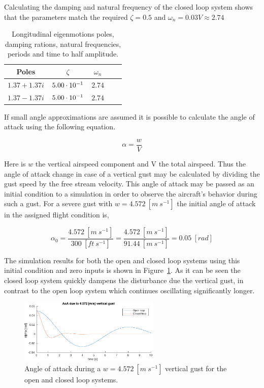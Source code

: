                                                                        
                                                                 

Calculating the damping and natural frequency of the closed loop system shows that the parameters match the required $\zeta=0.5$ and $\omega_n=0.03V\approx 2.74$
\begin{table}[h!]
    \centering
    \begin{tabular}{ c c c c c }
         Poles         & $\zeta$        & $\omega_n$ \\ \hline \hline
         $1.37 + 1.37i$ & $5.00\cdot 10^{-1}$ & $2.74$     \\  
         $1.37 - 1.37i$ & $5.00\cdot 10^{-1}$ & $2.74$     \\ \hline
    \end{tabular}
    \caption{Longitudinal eigenmotions poles, damping rations, natural frequencies, periods and time to half amplitude.}
\end{table}

If small angle approximations are assumed it is possible to calculate the angle of attack using the following equation.

\begin{equation}
    \alpha = \frac{w}{V}
\end{equation}

Here is $w$ the vertical airspeed component and V the total airspeed. Thus the angle of attack change in case of a vertical gust may be calculated by dividing the gust speed by the free stream velocity. This angle of attack may be passed as an initial condition to a simulation in order to observe the aircraft's behavior during such a gust. For a severe gust with $w=4.572\ [m\ s^{-1}]$ the initial angle of attack in the assigned flight condition is,

\begin{equation}
    \alpha_0=\frac{4.572\ [m\ s^{-1}]}{300\ [ft\ s^{-1}]}=\frac{4.572\ [m\ s^{-1}]}{91.44\ [m\ s^{-1}]} = 0.05\ [rad]
\end{equation}

The simulation results for both the open and closed loop systems using this initial condition and zero inputs is shown in Figure~\ref{fig:pc_vertgust}. As it can be seen the closed loop system quickly dampens the disturbance due the vertical gust, in contrast to the open loop system which continues oscillating significantly longer.

\begin{figure}[ht]
    \centering
    \includegraphics[width=0.6\textwidth]{figures/pc_vertgust.pdf}    
    \caption{Angle of attack during a $w=4.572\ [m\ s^{-1}]$ vertical gust for the open and closed loop systems.}
    \label{fig:pc_vertgust}
\end{figure}

